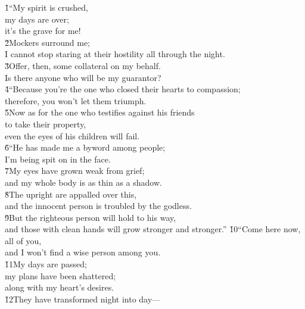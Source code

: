 \begin{poetry}
\poeml {}
\v{1}``My spirit is crushed, \\
\poemll    my days are over; \\
\poemlll       it's the grave for me! \\
\poeml \v{2}Mockers surround me; \\
\poemll    I cannot stop staring at their hostility all through the night. \\
\poeml \v{3}Offer, then, some collateral on my behalf. \\
\poemll    Is there anyone who will be my guarantor? \\
\poeml \v{4}``Because you're the one who closed their hearts to compassion; \\
\poemll    therefore, you won't let them triumph. \\
\poeml \v{5}Now as for the one who testifies against his friends \\
\poemll    to take their property, \\
\poemlll       even the eyes of his children will fail. \\
\poeml \v{6}``He has made me a byword among people; \\
\poemll    I'm being spit on in the face. \\
\poeml \v{7}My eyes have grown weak from grief; \\
\poemll    and my whole body is as thin as a shadow. \\
\poeml \v{8}The upright are appalled over this, \\
\poemll    and the innocent person is troubled by the godless. \\
\poeml \v{9}But the righteous person will hold to his way, \\
\poemll    and those with clean hands will grow stronger and stronger.''
\poeml \v{10}``Come here now, all of you, \\
\poemll    and I won't find a wise person among you. \\
\poeml \v{11}My days are passed; \\
\poemll    my plans have been shattered; \\
\poemlll       along with my heart's desires. \\
\poeml \v{12}They have transformed night into day--- \\

\end{poetry}
